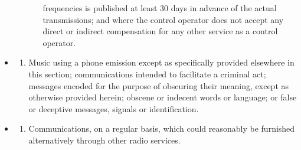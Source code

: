 \documentclass[
  letterpaper,
  DIV=11,
  numbers=noendperiod]{scrreport}
\providecommand{\tightlist}{%
  \setlength{\itemsep}{0pt}\setlength{\parskip}{0pt}}\usepackage{longtable,booktabs,array}
\begin{document}
\begin{itemize}
\begin{itemize}
\begin{enumerate}
      frequencies is published at least 30 days in advance of the actual
      transmissions; and where the control operator does not accept any
      direct or indirect compensation for any other service as a control
      operator.
    \end{enumerate}
  \end{itemize}
\item
  \begin{enumerate}
  \def\labelenumi{(\arabic{enumi})}
  \setcounter{enumi}{3}
  \tightlist
  \item
    Music using a phone emission except as specifically provided
    elsewhere in this section; communications intended to facilitate a
    criminal act; messages encoded for the purpose of obscuring their
    meaning, except as otherwise provided herein; obscene or indecent
    words or language; or false or deceptive messages, signals or
    identification.
  \end{enumerate}
\item
  \begin{enumerate}
  \def\labelenumi{(\arabic{enumi})}
  \setcounter{enumi}{4}
  \tightlist
  \item
    Communications, on a regular basis, which could reasonably be
    furnished alternatively through other radio services.
  \end{enumerate}
\end{itemize}
\end{document}
